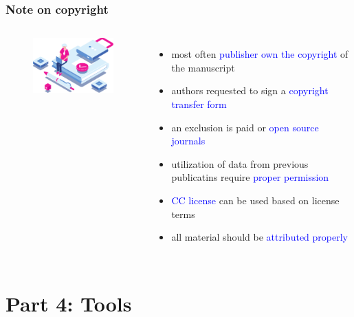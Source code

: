 \documentclass[newPxFont,sthlmFooter]{beamer}
\newcommand{\fs}{\footnotesize}
\begin{document}
\begin{frame}\frametitle{Note on copyright}
  \begin{columns}[T,onlytextwidth]
    \vspace{1cm}
  \begin{figure}
    \centering
    \includegraphics[width=2in]{figs/cc} 
  \end{figure}
\begin{itemize}
  \fs
  \item most often \textcolor{blue}{publisher own the copyright} of the manuscript
  \item authors requested to sign a \textcolor{blue}{copyright transfer form}
  \item an exclusion is paid or \textcolor{blue}{open source journals}
  \item utilization of data from previous publicatins require \textcolor{blue}{proper permission}
  \item \textcolor{blue}{CC license} can be used based on license terms
  \item all material should be \textcolor{blue}{attributed properly}
  \end{itemize}
  \end{columns}
\end{frame}

\section{Part 4: Tools}
\end{document}
